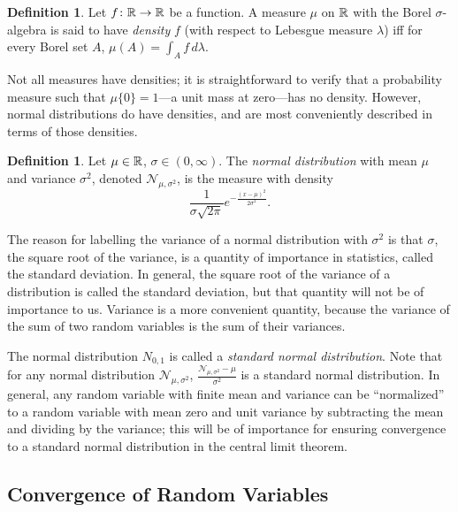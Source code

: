 \documentclass{article}
\theoremstyle{definition}
\newtheorem{definition}[theorem]{Definition}
\begin{document}
\begin{definition}
Let $f\colon \mathbb{R} \rightarrow \mathbb{R}$ be a function. A measure $\mu$ on $\mathbb{R}$ with the Borel $\sigma$-algebra is said to have {\em density} $f$ (with respect to Lebesgue measure $\lambda$) iff for every Borel set $A$, $\mu(A) = \int_A f \, d\lambda$.
\end{definition}

Not all measures have densities; it is straightforward to verify that a probability measure such that $\mu \{0\} = 1$---a unit mass at zero---has no density. However, normal distributions do have densities, and are most conveniently described in terms of those densities.

\begin{definition}
Let $\mu \in \mathbb{R}$, $\sigma \in (0, \infty)$. The {\em normal distribution} with mean $\mu$ and variance $\sigma^2$, denoted $\mathcal N_{\mu, \sigma^2}$, is the measure with density
\[ \frac{1}{\sigma \sqrt{2\pi}} e^{-\frac{(x-\mu)^2}{2\sigma^2}}. \]
\end{definition}

The reason for labelling the variance of a normal distribution with $\sigma^2$ is that $\sigma$, the square root of the variance, is a quantity of importance in statistics, called the standard deviation. In general, the square root of the variance of a distribution is called the standard deviation, but that quantity will not be of importance to us. Variance is a more convenient quantity, because the variance of the sum of two random variables is the sum of their variances.

The normal distribution $N_{0,1}$ is called a {\em standard normal distribution}. Note that for any normal distribution $\mathcal N_{\mu, \sigma^2}$, $\frac{\mathcal N_{\mu, \sigma^2} - \mu}{\sigma^2}$ is a standard normal distribution. In general, any random variable with finite mean and variance can be ``normalized'' to a random variable with mean zero and unit variance by subtracting the mean and dividing by the variance; this will be of importance for ensuring convergence to a standard normal distribution in the central limit theorem.

\subsection{Convergence of Random Variables}
\end{document}
